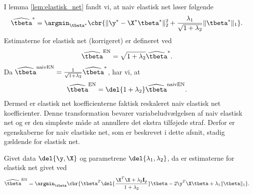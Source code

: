 I lemma \ref{lem:elastisk_net} fandt vi, at naiv elastisk net løser følgende 
\begin{align}
\widehat{\tbeta}^* = \argmin_{\tbeta^*} \cbr{ \Vert \y^* - \X^* \tbeta^* \Vert_2^2 + \frac{\lambda_1}{\sqrt{1+\lambda_2}} \Vert \tbeta^* \Vert_1}. \label{eq:EN8}
\end{align}
Estimaterne for elastisk net (korrigeret) er defineret ved
\begin{align*}
\widehat{\tbeta}^\text{EN} = \sqrt{1+\lambda_2} \widehat{\tbeta}^*.
\end{align*}
Da \(\widehat{\tbeta}^\text{naivEN} = \frac{1}{\sqrt{1+\lambda_2}} \widehat{\tbeta}^*\), har vi, at
\begin{align*}
\widehat{\tbeta}^\text{EN} = \del{1+\lambda_2} \widehat{\tbeta}^\text{naivEN}.
\end{align*}
Dermed er elastisk net koefficienterne faktisk reskaleret naiv elastisk net koefficienter.
Denne transformation bevarer variabeludvælgelsen af naiv elastisk net og er den simpleste måde at annullere det ekstra tilføjede straf.
Derfor er egenskaberne for naiv elastiske net, som er beskrevet i dette afsnit, stadig gældende for elastisk net.
%
\begin{thm} \label{thm:elastisk_net2}
Givet data \(\del{\y, \X}\) og parametrene \(\del{\lambda_1, \lambda_2}\), da er estimaterne for elastisk net givet ved
\begin{align}
\widehat{\tbeta}^\text{EN} = \argmin_{\tbeta} \cbr{ \tbeta^T \del{\frac{\X^T \X + \lambda_2 \mathbf{I}_p}{1 + \lambda_2}} \tbeta - 2 \y^T \X \tbeta + \lambda_1 \Vert \tbeta \Vert_1}. \label{eq:EN6}
\end{align}
\end{thm}
